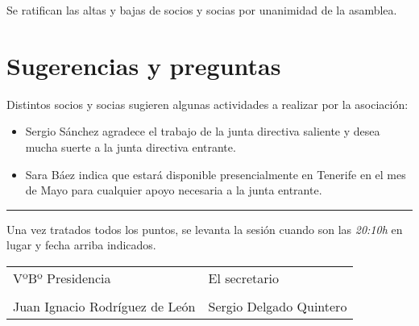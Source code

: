 \documentclass[a4paper,12pt]{article}
\begin{document}
Se ratifican las altas y bajas de socios y socias por unanimidad de la asamblea.

\section{Sugerencias y preguntas}

Distintos socios y socias sugieren algunas actividades a realizar por la asociación:

\begin{itemize}
    \item Sergio Sánchez agradece el trabajo de la junta directiva saliente y desea mucha suerte a la junta directiva entrante.
    \item Sara Báez indica que estará disponible presencialmente en Tenerife en el mes de Mayo para cualquier apoyo necesaria a la junta entrante.
\end{itemize}


\vspace{1cm}
\hrule
\vspace{3mm}

Una vez tratados todos los puntos, se levanta la sesión cuando son las \textit{20:10h} en lugar y fecha arriba indicados.

\vspace{1cm}

\begin{table}[h]
    \begin{tabular}{p{9cm}p{9cm}}
        VºBº Presidencia & El secretario \\
        \vspace{3cm} & \vspace{3cm} \\
        Juan Ignacio Rodríguez de León & Sergio Delgado Quintero \\
    \end{tabular}
\end{table}
\end{document}
